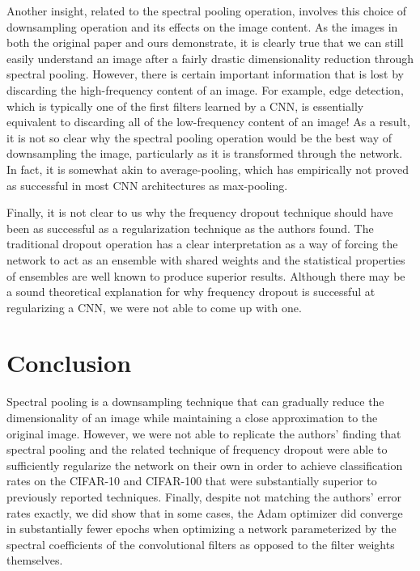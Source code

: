 \documentclass[10pt,journal,compsoc]{IEEEtran}
\begin{document}
Another insight, related to the spectral pooling operation, involves this choice of downsampling operation and its effects on the image content. As the images in both the original paper and ours demonstrate, it is clearly true that we can still easily understand an image after a fairly drastic dimensionality reduction through spectral pooling. However, there is certain important information that is lost by discarding the high-frequency content of an image. For example, edge detection, which is typically one of the first filters learned by a CNN, is essentially equivalent to discarding all of the low-frequency content of an image! As a result, it is not so clear why the spectral pooling operation would be the best way of downsampling the image, particularly as it is transformed through the network. In fact, it is somewhat akin to average-pooling, which has empirically not proved as successful in most CNN architectures as max-pooling.

Finally, it is not clear to us why the frequency dropout technique should have been as successful as a regularization technique as the authors found. The traditional dropout operation has a clear interpretation as a way of forcing the network to act as an ensemble with shared weights and the statistical properties of ensembles are well known to produce superior results. Although there may be a sound theoretical explanation for why frequency dropout is successful at regularizing a CNN, we were not able to come up with one.

\section{Conclusion}

Spectral pooling is a downsampling technique that can gradually reduce the dimensionality of an image while maintaining a close approximation to the original image. However, we were not able to replicate the authors' finding that spectral pooling and the related technique of frequency dropout were able to sufficiently regularize the network on their own in order to achieve classification rates on the CIFAR-10 and CIFAR-100 that were substantially superior to previously reported techniques. Finally, despite not matching the authors' error rates exactly, we did show that in some cases, the Adam optimizer did converge in substantially fewer epochs when optimizing a network parameterized by the spectral coefficients of the convolutional filters as opposed to the filter weights themselves.
\end{document}
